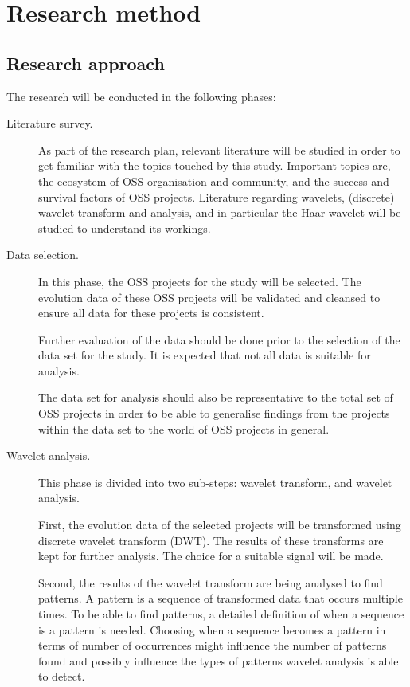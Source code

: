\chapter{Research method}
\label{method}

\section{Research approach}
The research will be conducted in the following phases:
\begin{description}
	\item[Literature survey.] As part of the research plan, relevant literature
	will be studied in order to get familiar with the topics touched by this
	study. Important topics are, the ecosystem of OSS organisation and community,
	and the success and survival factors of OSS projects. Literature regarding
	wavelets, (discrete) wavelet transform and analysis, and in particular the
	Haar wavelet will be studied to understand its workings.

	\item[Data selection.] In this phase, the OSS projects for the study will be
	selected. The evolution data of these OSS projects will be validated and
	cleansed to ensure all data for these projects is consistent.

	Further evaluation of the data should be done prior to the selection of the
	data set for the study. It is expected that not all data is suitable for
	analysis.

	The data set for analysis should also be representative to the total set of
	OSS projects in order to be able to generalise findings from the
	projects within the data set to the world of OSS projects in general.
	
	\item[Wavelet analysis.] This phase is divided into two sub-steps: wavelet
	transform, and wavelet analysis.
	
	First, the evolution data of the selected projects will be transformed using
	discrete wavelet transform (DWT). The results of these transforms are kept for
	further analysis. The choice for a suitable signal will be made.
	
	Second, the results of the wavelet transform are being analysed to find
	patterns. A pattern is a sequence of transformed data that occurs multiple
	times. To be able to find patterns, a detailed definition of when a sequence
	is a pattern is needed. Choosing when a sequence becomes a pattern in terms of
	number of occurrences might influence the number of patterns found and
	possibly influence the types of patterns wavelet analysis is able to detect.
	

\end{description}
